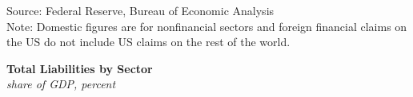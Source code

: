 \documentclass{report}
\newcommand{\tbllink}[1]{\href{https://raw.githubusercontent.com/bdecon/US-chartbook/master/chartbook/data/#1}{\faTable}}
\begin{document}
{\begin{minipage}{1.0\textwidth}
{ \setlength{\tabcolsep}{3.0pt} \color{black!90}
{\renewcommand{\arraystretch}{1.55}
\hspace*{-1mm} \begin{tabular}{p{37.6mm} R{11.4mm} R{11.2mm} R{11.2mm} R{11.2mm} R{10.7mm} R{10.2mm}}
		 \hline
	\end{tabular}}}
\vspace{-1mm}

\footnotesize{Source: Federal Reserve, Bureau of Economic Analysis}  \hfill \tbllink{liabsh.csv} \ \tbllink{liabpc.csv}\\
\footnotesize{Note: Domestic figures are for nonfinancial sectors and foreign financial claims on the US do not include US claims on the rest of the world.}
\end{minipage}
\newpage
{}
\begin{minipage}{1.0\textwidth}
\small 
\end{minipage}

\begin{minipage}{0.35\textwidth} 
\normalsize \textbf{Total Liabilities by Sector}\\
\footnotesize{\textit{share of GDP, percent}}
\vspace{4.6cm}


\end{minipage}}
\end{document}
